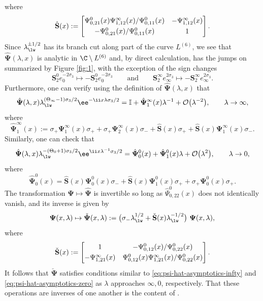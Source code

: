 where
\begin{equation*}
\hat{\mathbf{S}} (x):= \begin{bmatrix}
\Psi_{0, 21}^0(x) \Psi_{1, 12}^\infty(x)/\Psi^0_{0,11}(x) & -\Psi_{1, 12}^\infty(x) \vspace{1mm}\\ -\Psi_{0, 21}^0(x)/\Psi_{0, 11}^0(x) & 1
\end{bmatrix}.
\end{equation*}
Since $\lambda_{\lw}^{\pm 1/2}$ has its branch cut along part of the curve $L^{(6)}$, we see that $\hat{\mathbf{\Psi}}(\lambda, x)$ is analytic in $\C \setminus L^{(6)}$ and, by direct calculation, has the jumps on  summarized by Figure \ref{fig:1}, with the exception of the sign changes
\[
\mathbf{S}_2^0 e_0^{-2\sigma_3} \mapsto -\mathbf{S}_2^0 e_0^{-2\sigma_3} \qquad \text{and} \qquad \mathbf{S}_2^\infty e_\infty^{2\sigma_3} \mapsto -\mathbf{S}_2^\infty e_\infty^{2\sigma_3}.
\]
Furthermore, one can verify using the definition of $\hat{\mathbf{\Psi}}(\lambda, x)$ that
\begin{equation}
\label{eq:psi-hat-asymptotics-infty}
\hat{\mathbf{\Psi}}(\lambda, x) \lambda_{\lw}^{(\Theta_\infty - 1)\sigma_3/2} \ee^{-\ii x \lambda \sigma_3/2}= \mathbb{I} + \hat{\mathbf{\Psi}}^\infty_1(x) \lambda^{-1} + \mathcal{O}\big(\lambda^{-2}\big), \qquad \lambda \to \infty,
\end{equation}
where
\[
\hat{\mathbf{\Psi}}_1^\infty(x) := \sigma_+ \mathbf{\Psi}^\infty_1(x) \sigma_+ + \sigma_+ \mathbf{\Psi}_2^\infty(x) \sigma_- + \hat{\mathbf{S}}(x) \sigma_+ + \hat{\mathbf{S}}(x) \mathbf{\Psi}_1^\infty (x) \sigma_-.
\]
Similarly, one can check that
\begin{equation}
\label{eq:psi-hat-asymptotics-zero}
\hat{\mathbf{\Psi}}(\lambda, x) \lambda_{\lw}^{-(\Theta_0 + 1)\sigma_3/2} \ee^{\ii x \lambda^{-1} \sigma_3/2}= \hat{\mathbf{\Psi}}^0_0(x) + \hat{\mathbf{\Psi}}^0_1(x) \lambda + \mathcal{O}\big(\lambda^{2}\big), \qquad \lambda \to 0,
\end{equation}
where
\[
\hat{\mathbf{\Psi}}^0_0(x) = \hat{\mathbf{S}}(x) \mathbf{\Psi}^0_0(x) \sigma_- + \hat{\mathbf{S}}(x) \mathbf{\Psi}^0_1(x) \sigma_+ + \sigma_+ \mathbf{\Psi}^0_0(x) \sigma_+.
\]
The transformation $\mathbf{\Psi} \mapsto \hat{\mathbf{\Psi}}$ is invertible so long as $\hat{\Psi}_{0, 22}^0(x)$ does not identically vanish, and its inverse is given by
\[
\mathbf{\Psi}(x, \lambda) \mapsto \check{\mathbf{\Psi}}(x, \lambda) := \big( \sigma_- \lambda^{1/2}_{\lw} + \check{\mathbf{S}}(x) \lambda^{-1/2}_{\lw} \big) \ \mathbf{\Psi}(x, \lambda),
\]
where
\[
\check{\mathbf{S}}(x) := \begin{bmatrix}
1 & - \Psi_{0, 12}^0(x) /\Psi_{0, 22}^0(x) \vspace{1mm}\\ - \Psi_{1, 21}^\infty(x) & \Psi_{0, 12}^0(x) \Psi_{1, 21}^\infty(x) /\Psi_{0, 22}^0(x)
\end{bmatrix}.
\]
It follows that $\check{\mathbf{\Psi}}$ satisfies conditions similar to \eqref{eq:psi-hat-asymptotics-infty} and \eqref{eq:psi-hat-asymptotics-zero} as $\lambda$ approaches $\infty, 0$, respectively. That these operations are inverses of one another is the content of \cite[Lemma~1]{BMS18}.

